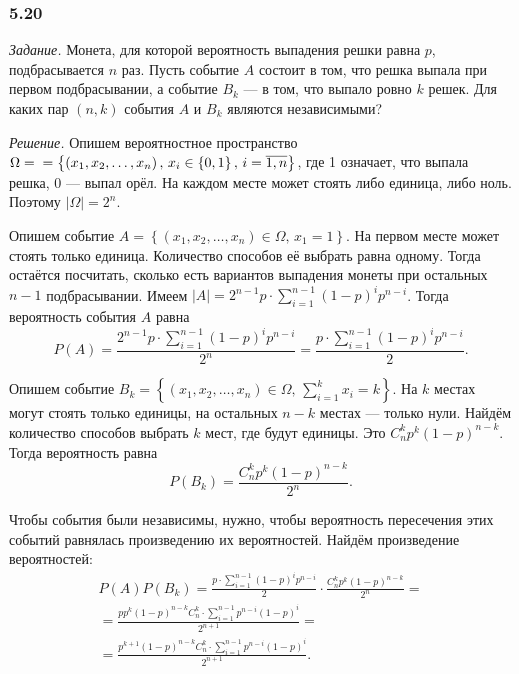 \subsubsection*{5.20}

\textit{Задание.} Монета, для которой вероятность выпадения решки равна $p$, подбрасывается $n$ раз.
Пусть событие $A$ состоит в том, что решка выпала при первом подбрасывании, а событие $B_k$ --- в том, что выпало ровно $k$ решек.
Для каких пар $ \left( n, k \right) $ события $A$ и $B_k$ являются независимыми?

\textit{Решение.}
Опишем вероятностное пространство
$ \Omega = \\
= \left\{ \left( x_1, x_2, \dotsc, x_n \right), \,
x_i \in \left\{ 0, 1\right\}, \,
i = \overline{1, n} \right\} $,
где 1 означает, что выпала решка, 0 --- выпал орёл.
На каждом месте может стоять либо единица, либо ноль.
Поэтому $ \left| \Omega \right| =2^n$.

Опишем событие $A = \left\{ \left( x_1, x_2, \dotsc, x_n \right) \in \Omega, \, x_1 = 1 \right\} $.
На первом месте может стоять только единица.
Количество способов её выбрать равна одному.
Тогда остаётся посчитать, сколько есть вариантов выпадения монеты при остальных $n - 1$ подбрасывании.
Имеем $ \left| A \right| = 2^{n-1} p \cdot \sum \limits_{i=1}^{n-1} \left( 1-p \right)^i p^{n-i}$.
Тогда вероятность события $A$ равна
$$P \left( A \right) =
\frac{2^{n-1} p \cdot \sum \limits_{i=1}^{n-1} \left( 1-p \right)^i p^{n-i}}{2^n} =
\frac{p \cdot \sum \limits_{i=1}^{n-1} \left( 1-p \right)^i p^{n-i}}{2}.$$

Опишем событие $B_k = \left\{ \left( x_1, x_2, \dotsc, x_n \right) \in \Omega, \, \sum \limits_{i=1}^k x_i = k \right\} $.
На $k$ местах могут стоять только единицы, на остальных $n - k$ местах --- только нули.
Найдём количество способов выбрать $k$ мест, где будут единицы.
Это $C_n^k p^k \left( 1-p \right)^{n-k}$.
Тогда вероятность равна
$$P \left( B_k \right) =
\frac{C_n^k p^k \left( 1-p \right)^{n-k}}{2^n}.$$

Чтобы события были независимы, нужно, чтобы вероятность пересечения этих событий равнялась произведению их вероятностей.
Найдём произведение вероятностей:
\begin{equation*}
\begin{split}
P \left( A \right) P \left( B_k \right) =
\frac{p \cdot \sum \limits_{i=1}^{n-1} \left( 1-p \right)^i p^{n-i}}{2} \cdot \frac{C_n^k p^k \left( 1-p \right)^{n-k}}{2^n} = \\
= \frac{p p^k \left( 1-p \right)^{n-k} C_n^k \cdot \sum \limits_{i=1}^{n-1} p^{n-i} \left( 1-p \right)^i}{2^{n+1}} = \\
= \frac{p^{k+1} \left( 1-p \right)^{n-k} C_n^k \cdot \sum \limits_{i=1}^{n-1} p^{n-i} \left( 1-p \right)^i}{2^{n+1}}.
\end{split}
\end{equation*}

